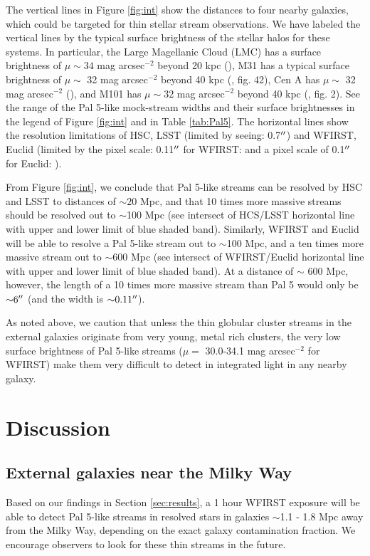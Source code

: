 \documentclass[twocolumn]{aastex62}
\begin{document}
The vertical lines in Figure \ref{fig:int} show the distances to four nearby galaxies, which could be targeted for thin stellar stream observations. We have labeled the vertical lines by the typical surface brightness of the stellar halos for these systems. In particular, the Large Magellanic Cloud (LMC) has a surface brightness of $\mu \sim 34$ mag arcsec$^{-2}$ beyond 20 kpc (\citealt{nidever18}), M31 has a typical surface brightness of  $\mu \sim$ 32 mag arcsec$^{-2}$ beyond 40 kpc (\citealt{ibata07}, fig. 42), Cen A has  $\mu \sim $ 32 mag arcsec$^{-2}$ (\citealt{crno16}), and M101 has  $\mu \sim 32 $ mag arcsec$^{-2}$ beyond 40 kpc (\citealt{dokkum14}, fig. 2). See the range of the Pal 5-like mock-stream widths and their surface brightnesses in the legend of Figure \ref{fig:int} and in Table \ref{tab:Pal5}. The horizontal lines show the resolution limitations of HSC, LSST (limited by seeing: 0.7$\mbox{$^{\prime\prime}$}$) and WFIRST, Euclid (limited by the pixel scale: 0.11$\mbox{$^{\prime\prime}$}$ for WFIRST: \citealt{spergel13} and a pixel scale of 0.1$\mbox{$^{\prime\prime}$}$ for Euclid: \citealt{racca16}). 

From Figure \ref{fig:int}, we conclude that Pal 5-like streams can be resolved by HSC and LSST to distances of ${\sim} 20$ Mpc, and that 10 times  more massive streams should be resolved out to $ \sim$100 Mpc (see intersect of HCS/LSST horizontal line with upper and lower limit of blue shaded band). Similarly, WFIRST and Euclid will be able to resolve a Pal 5-like stream out to $\sim$100 Mpc, and a ten times more massive stream out to $\sim$600 Mpc (see intersect of WFIRST/Euclid horizontal line with upper and lower limit of blue shaded band). At a distance of $\sim$ 600 Mpc, however, the length of a 10 times  more massive stream than Pal 5 would only be ${\sim} 6\mbox{$^{\prime\prime}$}$ (and the width is ${\sim} 0.11\mbox{$^{\prime\prime}$}$). 

As noted above, we caution that unless the thin globular cluster streams in the external galaxies originate from very young, metal rich clusters, the very low surface brightness of Pal 5-like streams ($\mu =$ 30.0-34.1 mag arcsec$^{-2}$ for WFIRST) make them very difficult to detect in integrated light in any nearby galaxy.





\section{Discussion}
\label{sec:discussion}

\subsection{External galaxies near the Milky Way}
\label{sec:kara}
Based on our findings in Section \ref{sec:results}, a 1 hour WFIRST exposure will be able to detect Pal 5-like streams in resolved stars in galaxies $\sim$1.1 - 1.8 Mpc away from the Milky Way, depending on the exact galaxy contamination fraction. We encourage observers to look for these thin streams in the future. 
\end{document}
